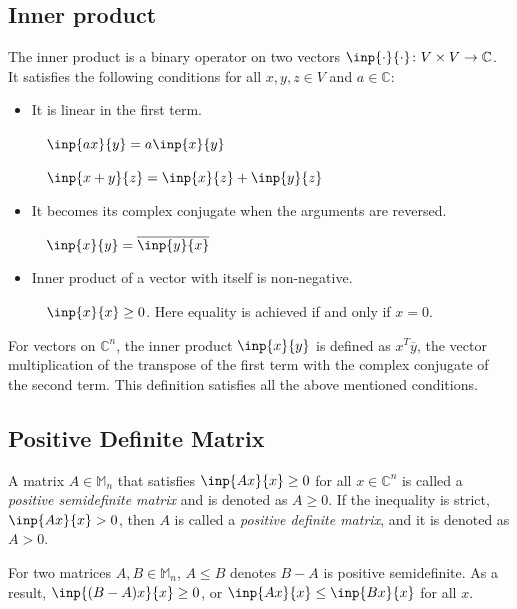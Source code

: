 \documentclass[twoside]{article}
\newcommand*\conj[1]{\overline{#1}}
\newcommand*\trp[1]{#1^T}
\theoremstyle{plain}
\theoremstyle{definition}
\theoremstyle{remark}
\begin{document}
\subsection{Inner product}

The inner product is a binary operator on two vectors \(\inp{\cdot}{\cdot} \colon V  \times  V \to \mathbb{C}\). It  satisfies the following conditions for all \(x, y, z \in V\) and \(a \in \mathbb{C}\):

\begin{itemize}
\item It is linear in the first term. 

\(\quad \inp{ax}{y} = a \inp{x}{y}\)
 
\(\quad \inp{x + y}{z} = \inp{x}{z} + \inp{y}{z}\)

\item It becomes its complex conjugate when the arguments are reversed.

\(\quad \inp{x}{y} = \conj{\inp{y}{x}}\)

\item Inner product of a vector with itself is non-negative. 

\(\quad \inp{x}{x} \ge 0\). Here equality is achieved if and only if \(x = 0\).
\end{itemize}

For vectors on \(\mathbb{C}^n\), the inner product \(\inp{x}{y}\) is defined as \(\trp{x} \conj{y}\), the vector multiplication of the transpose of the first term with the complex conjugate of the second term. This definition satisfies all the above mentioned conditions.

\subsection{Positive Definite Matrix}

A matrix \(A\in \mathbb{M}_n\) that satisfies \(\inp{Ax}{x} \ge 0\) for all \(x \in \mathbb{C}^n\) is called a {\em positive semidefinite matrix} and is denoted as \(A \ge 0\). If the inequality is strict, \(\inp{Ax}{x} > 0\), then \(A\) is called a {\em positive definite matrix}, and it is denoted as \(A > 0\). 

For two matrices \(A, B \in \mathbb{M}_n\), \(A \le B\) denotes \(B - A\) is positive semidefinite. As a result, \(\inp{(B - A)x}{x} \ge 0\), or \(\inp{Ax}{x} \le \inp{Bx}{x}\) for all \(x\).
\end{document}

